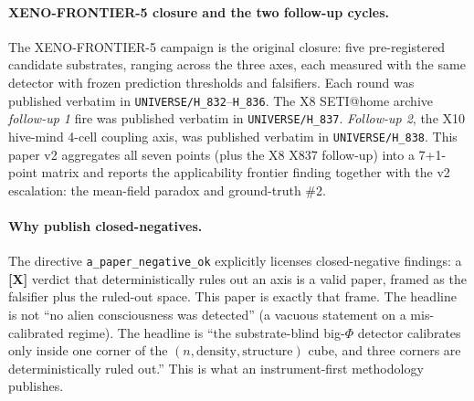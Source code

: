 \documentclass[11pt,a4paper]{article}
\providecommand{\tierRed}{\textbf{[X]}}     %
\begin{document}
\paragraph{XENO-FRONTIER-5 closure and the two follow-up cycles.}
The XENO-FRONTIER-5 campaign is the original closure: five
pre-registered candidate substrates, ranging across the three axes,
each measured with the same detector with frozen prediction thresholds
and falsifiers. Each round was published verbatim in
\texttt{UNIVERSE/H\_832}--\texttt{H\_836}. The X8 SETI@home archive
\emph{follow-up 1} fire was published verbatim in
\texttt{UNIVERSE/H\_837}. \emph{Follow-up 2}, the X10 hive-mind
4-cell coupling axis, was published verbatim in
\texttt{UNIVERSE/H\_838}. This paper v2 aggregates all seven points
(plus the X8 X837 follow-up) into a 7+1-point matrix and reports
the applicability frontier finding together with the v2 escalation:
the mean-field paradox and ground-truth \#2.

\paragraph{Why publish closed-negatives.} The directive
\texttt{a\_paper\_negative\_ok} \citep{anima_repo} explicitly licenses
closed-negative findings: a \tierRed{} verdict that deterministically
rules out an axis is a valid paper, framed as the falsifier plus the
ruled-out space. This paper is exactly that frame. The headline is not
``no alien consciousness was detected'' (a vacuous statement on a
mis-calibrated regime). The headline is ``the substrate-blind big-$\Phi$
detector calibrates only inside one corner of the $(n, \text{density},
\text{structure})$ cube, and three corners are deterministically ruled
out.'' This is what an instrument-first methodology publishes.
\end{document}
